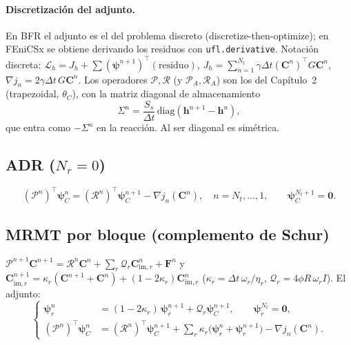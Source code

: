 \documentclass[11pt]{article}
\numberwithin{equation}{section}
\theoremstyle{remark}
\newcommand{\im}{\mathrm{im}}
\begin{document}
\paragraph{Discretización del adjunto.} En BFR el adjunto es el del problema discreto (discretize-then-optimize); en FEniCSx se obtiene derivando los residuos con \texttt{ufl.derivative}. Notaci\'on discreta: $\mathcal{L}_h=J_h+\sum(\boldsymbol\psi^{n+1})^\top(\text{residuo})$, $J_h=\sum_{n=1}^{N_t}\gamma\Delta t(\mathbf{C}^n)^\top G\mathbf{C}^n$,
$\nabla j_n=2\gamma\Delta t\,G\mathbf{C}^n$. Los operadores $\mathcal{P},\mathcal{R}$ (y $\mathcal{P}_A,\mathcal{R}_A$) son los del Cap\'itulo~2 (trapezoidal, $\theta_C$), con la matriz diagonal de almacenamiento
\[
\Sigma^n=\frac{S_s}{\Delta t}\,\mathrm{diag}(\mathbf{h}^{n+1}-\mathbf{h}^n),
\]
que entra como $-\Sigma^n$ en la reacci\'on. Al ser diagonal es sim\'etrica.

\subsection*{ADR ($N_r=0$)}
\begin{equation}
(\mathcal{P}^{n})^\top\boldsymbol\psi_C^{n}=(\mathcal{R}^{n})^\top\boldsymbol\psi_C^{n+1}-\nabla j_n(\mathbf{C}^n),\quad n=N_t,\dots,1,\qquad\boldsymbol\psi_C^{N_t+1}=\mathbf{0}.
\label{eq:disc_adr}
\end{equation}

\subsection*{MRMT por bloque (complemento de Schur)}
$\mathcal{P}^{n+1}\mathbf{C}^{n+1}=\mathcal{R}^{n}\mathbf{C}^n+\sum_r\mathcal{Q}_r\mathbf{C}_{\im,r}^n+\mathbf{F}^n$ y $\mathbf{C}_{\im,r}^{n+1}=\kappa_r(\mathbf{C}^{n+1}+\mathbf{C}^n)+(1-2\kappa_r)\mathbf{C}_{\im,r}^n$
($\kappa_r=\Delta t\,\omega_r/\eta_r$, $\mathcal{Q}_r=4\phi R\,\omega_r I$). El adjunto:
\begin{equation}
\left\{\begin{aligned}
\boldsymbol\psi_r^{n}&=(1-2\kappa_r)\,\boldsymbol\psi_r^{n+1}+\mathcal{Q}_r\boldsymbol\psi_C^{n+1},\qquad \boldsymbol\psi_r^{N_t}=\mathbf{0},\\
(\mathcal{P}^{n})^\top\boldsymbol\psi_C^{n}&=(\mathcal{R}^{n})^\top\boldsymbol\psi_C^{n+1}+\sum_r\kappa_r\bigl(\boldsymbol\psi_r^{n}+\boldsymbol\psi_r^{n+1}\bigr)-\nabla j_n(\mathbf{C}^n).
\end{aligned}\right.
\label{eq:disc_block}
\end{equation}
\end{document}
